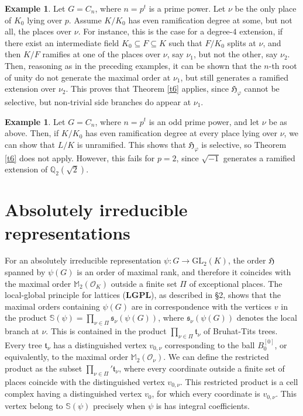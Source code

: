 \documentclass{article}
\theoremstyle{definition}
\newtheorem{ex}[Prop]{Example}
\theoremstyle{remark}
\begin{document}
\begin{ex}\label{e911}
    Let $G=C_n$, where $n=p^t$ is a prime power. 
    Let $\nu$ be the only
    place of $K_0$ lying over $p$.
    Assume $K/K_0$  has even ramification degree at some, 
    but not all, the places over $\nu$. For instance, 
    this is the case
    for a degree-$4$ extension,
    if there exist an intermediate field 
    $K_0\subseteq F\subseteq K$
    such that $F/K_0$ splits at $\nu$, and then $K/F$ ramifies
    at one of the places over $\nu$, say $\nu_1$, 
    but not the other,
    say $\nu_2$. Then, reasoning as in the preceding 
    examples, it can be shown that the $n$-th root of 
    unity do not generate the maximal
    order at $\nu_1$, but still generates a ramified extension
    over $\nu_2$. This proves that Theorem \ref{t6} applies,
    since $\mathfrak{H}_\varphi$ cannot be selective, 
    but non-trivial side branches do appear at $\nu_1$.
\end{ex}

\begin{ex}\label{e912}
    Let $G=C_n$, where $n=p^t$ is an odd prime power, and
    let $\nu$ be as above. Then, if
    $K/K_0$ has even ramification degree at every place 
    lying over $\nu$, we can show that $L/K$ is 
    unramified. This shows
    that $\mathfrak{H}_\varphi$ is selective,
    so Theorem \ref{t6} does not apply. 
    However, this fails for $p=2$,
    since $\sqrt{-1}$ generates a ramified extension of
    $\mathbb{Q}_2(\sqrt2)$.
\end{ex}


\section{Absolutely irreducible representations}\label{S9}

For an absolutely irreducible representation 
$\psi:G\rightarrow\mathrm{GL}_2(K)$, the order
$\mathfrak{H}$ spanned by $\psi(G)$ is an order
of maximal rank, and therefore it coincides with
the maximal order $\mathbb{M}_2(\mathcal{O}_K)$
outside a finite set $\Pi$ of exceptional places.
The local-global principle for lattices (\textbf{LGPL}),
as described in \S2, shows that the maximal orders 
containing $\psi(G)$ are in correspondence with the
vertices $v$ in the product 
$\mathbb{S}(\psi)=\prod_{\nu\in\Pi}\mathfrak{s}_\nu(\psi(G))$, where
$\mathfrak{s}_\nu(\psi(G))$ denotes the local branch at $\nu$.
This is contained in the product 
$\prod_{\nu\in\Pi}\mathfrak{t}_\nu$ of Bruhat-Tits trees.
Every tree $\mathfrak{t}_\nu$ has a distinguished
vertex $v_{0,\nu}$ corresponding to the ball
$B_0^{[0]}$, or equivalently, to the maximal order
$\mathbb{M}_2(\mathcal{O}_\nu)$. 
We can define the restricted product
as the subset $\prod_{\nu\in\Pi}'\mathfrak{t}_\nu$, where
every coordinate outside a finite set of places coincide
with the distinguished vertex $v_{0,\nu}$. 
This restricted product is
a cell complex having a distinguished vertex $v_0$, 
for which every coordinate is $v_{0,\nu}$.
This vertex belong to $\mathbb{S}(\psi)$ precisely when
$\psi$ is has integral coefficients.
\end{document}
